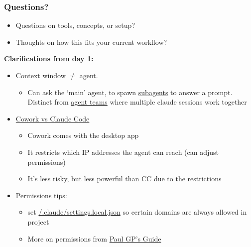 \documentclass[aspectratio=169, 12pt]{beamer}
\newcommand{\ghub}{https://tannerregan.github.io/GWU_AI_study_group/}
\begin{document}
\begin{frame}
\frametitle{Questions?}

\begin{itemize}
    \item Questions on tools, concepts, or setup?
    \item Thoughts on how this fits your current workflow?
\end{itemize}\vfill
{\bf Clarifications from day 1: }
\begin{itemize}
    \item Context window $\neq$ agent. 
    \begin{itemize}
        \item Can ask the `main' agent, to spawn \href{https://code.claude.com/docs/en/sub-agents}{subagents} to answer a prompt. Distinct from \href{https://code.claude.com/docs/en/agent-teams}{agent teams} where multiple claude sessions work together
    \end{itemize}
    \item \href{https://paulgp.substack.com/p/getting-started-with-claude-code?open=false\#\%C2\%A7what-is-a-context-window-and-how-does-it-work:~:text=Claude\%20Code\%20vs.\%20Cowork}{Cowork vs Claude Code}
    \begin{itemize}
        \item Cowork comes with the desktop app
        \item It restricts which IP addresses the agent can reach (can adjust permissions)
        \item It's less risky, but less powerful than CC due to the restrictions
    \end{itemize}
    \item Permissions tips: 
    \begin{itemize}
        \item set \href{\ghub/.claude/settings.local.json}{/.claude/settings.local.json} so certain domains are always allowed in project
        \item More on permissions from \href{https://paulgp.substack.com/p/permissions-sandboxes-and-autonomous?utm_source=post-email-title&publication_id=1015181&post_id=199022988&utm_campaign=email-post-title&isFreemail=true&r=313eqi&triedRedirect=true&utm_medium=email}{Paul GP's Guide}
    \end{itemize}
\end{itemize}
\end{frame}
\end{document}
